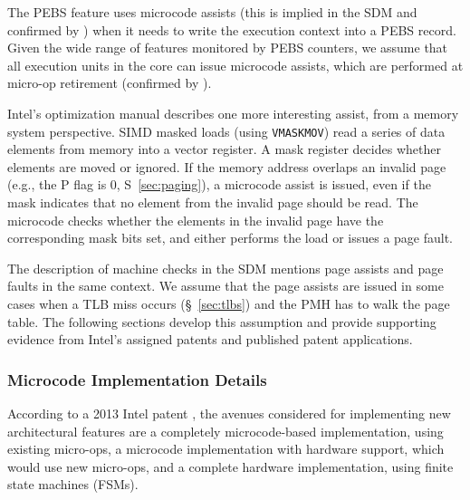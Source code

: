 The PEBS feature uses microcode assists (this is implied in the SDM and
confirmed by \cite{intel2014pebs}) when it needs to write the execution context
into a PEBS record. Given the wide range of features monitored by PEBS
counters, we assume that all execution units in the core can issue microcode
assists, which are performed at micro-op retirement (confirmed by
\cite{intel1997events}).


Intel's optimization manual describes one more interesting assist, from a
memory system perspective. SIMD masked loads (using \texttt{VMASKMOV}) read a
series of data elements from memory into a vector register. A mask register
decides whether elements are moved or ignored. If the memory address overlaps
an invalid page (e.g., the P flag is 0, S~\ref{sec:paging}), a microcode assist
is issued, even if the mask indicates that no element from the invalid page
should be read. The microcode checks whether the elements in the invalid page
have the corresponding mask bits set, and either performs the load or issues a
page fault.


The description of machine checks in the SDM mentions page assists and page
faults in the same context. We assume that the page assists are issued in some
cases when a TLB miss occurs (\S~\ref{sec:tlbs}) and the PMH has to walk the
page table. The following sections develop this assumption and provide
supporting evidence from Intel's assigned patents and published patent
applications.


\subsubsection{Microcode Implementation Details}


According to a 2013 Intel patent \cite{intel2013scattergather}, the avenues
considered for implementing new architectural features are a completely
microcode-based implementation, using existing micro-ops, a microcode
implementation with hardware support, which would use new micro-ops, and a
complete hardware implementation, using finite state machines (FSMs).


